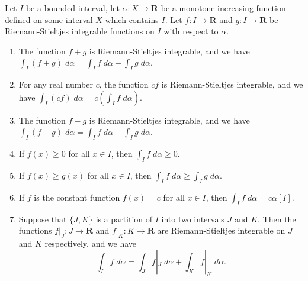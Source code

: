 \begin{additional corollary}\label{ac 11.8.11}
Let \(I\) be a bounded interval, let \(\alpha : X \to \mathbf{R}\) be a monotone increasing function defined on some interval \(X\) which contains \(I\).
Let \(f : I \to \mathbf{R}\) and \(g : I \to \mathbf{R}\) be Riemann-Stieltjes integrable functions on \(I\) with respect to \(\alpha\).
\begin{enumerate}
    \item The function \(f + g\) is Riemann-Stieltjes integrable, and we have \(\int_I (f + g) \; d \alpha = \int_I f \; d \alpha + \int_I g \; d \alpha\).
    \item For any real number \(c\), the function \(cf\) is Riemann-Stieltjes integrable, and we have \(\int_I (cf) \; d \alpha = c(\int_I f \; d \alpha)\).
    \item The function \(f - g\) is Riemann-Stieltjes integrable, and we have \(\int_I (f - g) \; d \alpha = \int_I f \; d \alpha - \int_I g \; d \alpha\).
    \item If \(f(x) \geq 0\) for all \(x \in I\), then \(\int_I f \; d \alpha \geq 0\).
    \item If \(f(x) \geq g(x)\) for all \(x \in I\), then \(\int_I f \; d \alpha \geq \int_I g \; d \alpha\).
    \item If \(f\) is the constant function \(f(x) = c\) for all \(x \in I\), then \(\int_I f \; d \alpha = c \alpha[I]\).
    \item Suppose that \(\{J, K\}\) is a partition of \(I\) into two intervals \(J\) and \(K\).
          Then the functions \(f|_J : J \to \mathbf{R}\) and \(f|_K : K \to \mathbf{R}\) are Riemann-Stieltjes integrable on \(J\) and \(K\) respectively, and we have
          \[
              \int_I f \; d \alpha = \int_J f|_J \; d \alpha + \int_K f|_K \; d \alpha.
          \]
\end{enumerate}
\end{additional corollary}

